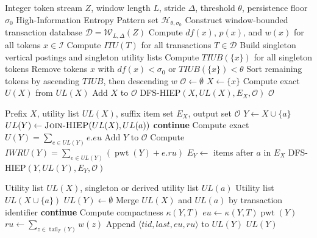 \documentclass[11pt,a4paper]{article}
\newcommand{\D}{\mathcal{D}}
\newcommand{\I}{\mathcal{I}}
\newcommand{\HIEP}{\mathcal{H}}
\newcommand{\Output}{\mathcal{O}}
\newcommand{\pwt}{\operatorname{pwt}}
\newcommand{\tail}{\operatorname{tail}}
\begin{document}
\begin{algorithm}[H]
\caption{HIEP-Miner}
\label{alg:hiepminer}
\begin{algorithmic}[1]
\REQUIRE Integer token stream \(Z\), window length \(L\), stride \(\Delta\), threshold \(\theta\), persistence floor \(\sigma_0\)
\ENSURE High-Information Entropy Pattern set \(\HIEP_{\theta,\sigma_0}\)
\STATE Construct window-bounded transaction database \(\D=\mathcal{W}_{L,\Delta}(Z)\)
\STATE Compute \(df(x)\), \(p(x)\), and \(w(x)\) for all tokens \(x\in\I\)
\STATE Compute \(ITU(T)\) for all transactions \(T\in\D\)
\STATE Build singleton vertical postings and singleton utility lists
\STATE Compute \(TIUB(\{x\})\) for all singleton tokens
\STATE Remove tokens \(x\) with \(df(x)<\sigma_0\) or \(TIUB(\{x\})<\theta\)
\STATE Sort remaining tokens by ascending \(TIUB\), then descending \(w\)
\STATE \(\Output\leftarrow\emptyset\)
    \STATE \(X\leftarrow\{x\}\)
    \STATE Compute exact \(U(X)\) from \(UL(X)\)
        \STATE Add \(X\) to \(\Output\)
    \ENDIF
        \STATE \textsc{DFS-HIEP}\((X,UL(X),E_X,\Output)\)
    \ENDIF
\ENDFOR
\RETURN \(\Output\)
\end{algorithmic}
\end{algorithm}

\begin{algorithm}[H]
\caption{\textsc{DFS-HIEP}}
\label{alg:dfs}
\begin{algorithmic}[1]
\REQUIRE Prefix \(X\), utility list \(UL(X)\), suffix item set \(E_X\), output set \(\Output\)
    \STATE \(Y\leftarrow X\cup\{a\}\)
    \STATE \(UL(Y)\leftarrow\textsc{Join-HIEP}(UL(X),UL(a))\)
        \STATE \textbf{continue}
    \ENDIF
    \STATE Compute exact \(U(Y)=\sum_{e\in UL(Y)}e.eu\)
        \STATE Add \(Y\) to \(\Output\)
    \ENDIF
    \STATE Compute \(IWRU(Y)=\sum_{e\in UL(Y)}(\pwt(Y)+e.ru)\)
        \STATE \(E_Y\leftarrow\) items after \(a\) in \(E_X\)
        \STATE \textsc{DFS-HIEP}\((Y,UL(Y),E_Y,\Output)\)
    \ENDIF
\ENDFOR
\end{algorithmic}
\end{algorithm}

\begin{algorithm}[H]
\caption{\textsc{Join-HIEP}}
\label{alg:join}
\begin{algorithmic}[1]
\REQUIRE Utility list \(UL(X)\), singleton or derived utility list \(UL(a)\)
\ENSURE Utility list \(UL(X\cup\{a\})\)
\STATE \(UL(Y)\leftarrow\emptyset\)
\STATE Merge \(UL(X)\) and \(UL(a)\) by transaction identifier
        \STATE \textbf{continue}
    \ENDIF
    \STATE Compute compactness \(\kappa(Y,T)\)
    \STATE \(eu\leftarrow \kappa(Y,T)\pwt(Y)\)
    \STATE \(ru\leftarrow\sum_{z\in\tail_T(Y)}w(z)\)
    \STATE Append \(\langle tid,last,eu,ru\rangle\) to \(UL(Y)\)
\ENDFOR
\RETURN \(UL(Y)\)
\end{algorithmic}
\end{algorithm}
\end{document}
